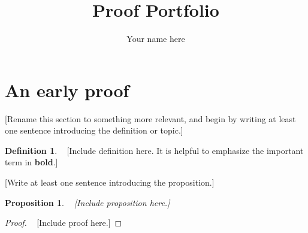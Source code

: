 \documentclass{article}
\title{Proof Portfolio}
\author{Your name here}
\newtheorem{proposition}[theorem]{Proposition}
\theoremstyle{definition} %
\newtheorem{definition}[theorem]{Definition}
\theoremstyle{remark} %
\begin{document}
\maketitle

\section{An early proof}
[Rename this section to something more relevant, and begin by writing at least one sentence introducing the definition or topic.]
\begin{definition}
  ~ [Include definition here. It is helpful to emphasize the important term in \textbf{bold}.]
\end{definition}

[Write at least one sentence introducing the proposition.]
\begin{proposition}
  ~ [Include proposition here.]
\end{proposition}
\begin{proof}
  ~ [Include proof here.]
\end{proof}
\end{document}
